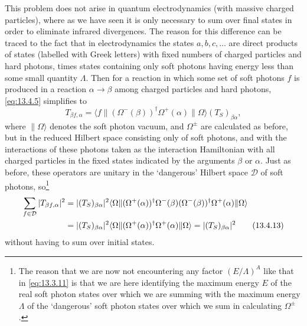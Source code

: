 This problem does not arise in quantum electrodynamics (with massive charged
particles), where as we have seen it is only necessary to sum over final states
in order to eliminate infrared divergences. The reason for this difference can
be traced to the fact that in electrodynamics the states $a,b,c,\ldots$ are
direct products of states (labelled with Greek letters) with fixed numbers of
charged particles and hard photons, times states containing only soft photons
having energy less than some small quantity $\Lambda$. Then for a reaction in
which some set of soft photons $f$ is produced in a reaction $\alpha\to\beta$
among charged particles and hard photons, \eqref{eq:13.4.5}
simplifies to
\begin{equation}
T_{\beta f,\alpha}
=\langle f\|(\Omega^-(\beta))^\dagger\Omega^+(\alpha)\|\Omega\rangle
(T_S)_{\beta\alpha},
\tag{13.4.12}\label{eq:13.4.12}
\end{equation}
where $\|\Omega\rangle$ denotes the soft photon vacuum, and $\Omega^\pm$ are
calculated as before, but in the reduced Hilbert space consisting only of soft
photons, and with the interactions of these photons taken as the interaction
Hamiltonian with all charged particles in the fixed states indicated by the
arguments $\beta$ or $\alpha$. Just as before, these operators are unitary in
the `dangerous' Hilbert space $\mathcal D$ of soft photons,
so\footnote{The reason that we are now not encountering any factor
$(E/\Lambda)^A$ like that in \eqref{eq:13.3.11} is that we are here
identifying the maximum energy $E$ of the real soft photon states over which we
are summing with the maximum energy $\Lambda$ of the `dangerous' soft photon
states over which we sum in calculating $\Omega^\pm$.}
\begin{align}
\sum_{f\in\mathcal D}|T_{\beta f,\alpha}|^2
={}&|(T_S)_{\beta\alpha}|^2
\langle\Omega\|(\Omega^+(\alpha))^\dagger\Omega^-(\beta)
(\Omega^-(\beta))^\dagger\Omega^+(\alpha)\|\Omega\rangle\notag\\
={}&|(T_S)_{\beta\alpha}|^2
\langle\Omega\|(\Omega^+(\alpha))^\dagger
\Omega^+(\alpha)\|\Omega\rangle
=|(T_S)_{\beta\alpha}|^2
\tag{13.4.13}\label{eq:13.4.13}
\end{align}
without having to sum over initial states.
